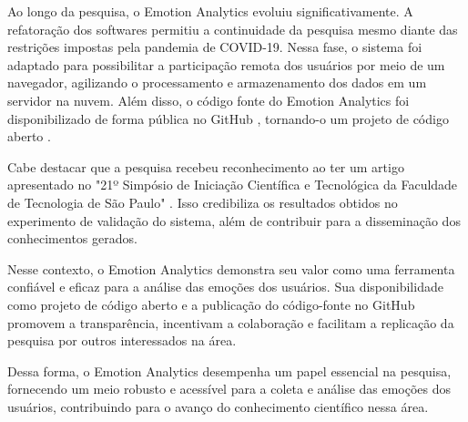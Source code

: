 Ao longo da pesquisa, o Emotion Analytics evoluiu significativamente. A refatoração dos softwares permitiu a continuidade da pesquisa mesmo diante das restrições impostas pela pandemia de COVID-19. Nessa fase, o sistema foi adaptado para possibilitar a participação remota dos usuários por meio de um navegador, agilizando o processamento e armazenamento dos dados em um servidor na nuvem. Além disso, o código fonte do Emotion Analytics foi disponibilizado de forma pública no GitHub \cite{22}\cite{23}, tornando-o um projeto de código aberto \cite{24}.

Cabe destacar que a pesquisa recebeu reconhecimento ao ter um artigo apresentado no "21º Simpósio de Iniciação Científica e Tecnológica da Faculdade de Tecnologia de São Paulo" \cite{25}. Isso credibiliza os resultados obtidos no experimento de validação do sistema, além de contribuir para a disseminação dos conhecimentos gerados.

Nesse contexto, o Emotion Analytics demonstra seu valor como uma ferramenta confiável e eficaz para a análise das emoções dos usuários. Sua disponibilidade como projeto de código aberto e a publicação do código-fonte no GitHub \cite{22}\cite{23} promovem a transparência, incentivam a colaboração e facilitam a replicação da pesquisa por outros interessados na área.

Dessa forma, o Emotion Analytics desempenha um papel essencial na pesquisa, fornecendo um meio robusto e acessível para a coleta e análise das emoções dos usuários, contribuindo para o avanço do conhecimento científico nessa área.
